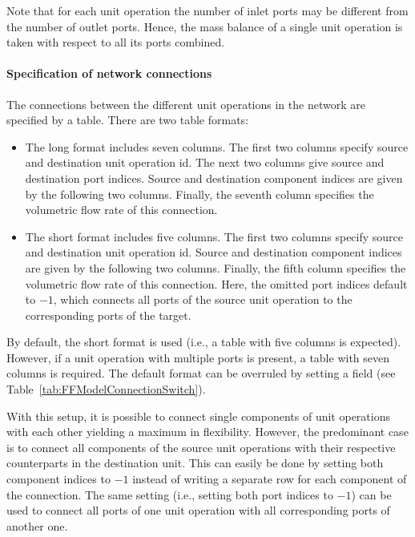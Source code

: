 Note that for each unit operation the number of inlet ports may be different from the number of outlet ports.
Hence, the mass balance of a single unit operation is taken with respect to all its ports combined.

\paragraph{Specification of network connections}
\label{par:MUOPNetworkConfig}

The connections  between the different unit operations in the network are specified by a table.
There are two table formats:
\begin{itemize}
	\item The long format includes seven columns.
	The first two columns specify source and destination unit operation id.
	The next two columns give source and destination port indices.
	Source and destination component indices are given by the following two columns.
	Finally, the seventh column specifies the volumetric flow rate of this connection.
	\item The short format includes five columns.
	The first two columns specify source and destination unit operation id.
	Source and destination component indices are given by the following two columns.
	Finally, the fifth column specifies the volumetric flow rate of this connection.
	Here, the omitted port indices default to $-1$, which connects all ports of the source unit operation to the corresponding ports of the target. 
\end{itemize}
By default, the short format is used (i.e., a table with five columns is expected).
However, if a unit operation with multiple ports is present, a table with seven columns is required.
The default format can be overruled by setting a field (see Table~\ref{tab:FFModelConnectionSwitch}).

With this setup, it is possible to connect single components of unit operations with each other yielding a maximum in flexibility.
However, the predominant case is to connect all components of the source unit operations with their respective counterparts in the destination unit.
This can easily be done by setting both component indices to $-1$ instead of writing a separate row for each component of the connection.
The same setting (i.e., setting both port indices to $-1$) can be used to connect all ports of one unit operation with all corresponding ports of another one.

